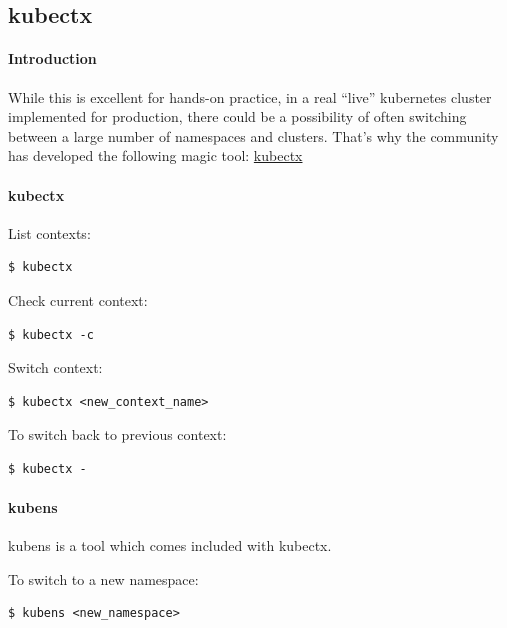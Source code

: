 \documentclass{article}
\newenvironment{codetemplate}[1][]{%
  \mybasecolorbox[#1]
  \itshape
}{%
  \endmybasecolorbox
}
\begin{document}
\subsection{kubectx}
\paragraph{Introduction}
While this is excellent for hands-on practice, in a real “live” kubernetes cluster implemented for production, there could be a possibility of often switching between a large number of namespaces and clusters.
That's why the community has developed the following magic tool: \href{https://github.com/ahmetb/kubectx}{kubectx}

\paragraph{kubectx}
List contexts:
\begin{codetemplate}{}
\begin{verbatim}
$ kubectx
\end{verbatim}
\end{codetemplate}

Check current context:
\begin{codetemplate}{}
\begin{verbatim}
$ kubectx -c
\end{verbatim}
\end{codetemplate}

Switch context:
\begin{codetemplate}{}
\begin{verbatim}
$ kubectx <new_context_name>
\end{verbatim}
\end{codetemplate}

To switch back to previous context:
\begin{codetemplate}{}
\begin{verbatim}
$ kubectx -
\end{verbatim}
\end{codetemplate}

\paragraph{kubens}
kubens is a tool which comes included with kubectx.

To switch to a new namespace:
\begin{codetemplate}{}
\begin{verbatim}
$ kubens <new_namespace>
\end{verbatim}
\end{codetemplate}
\end{document}
